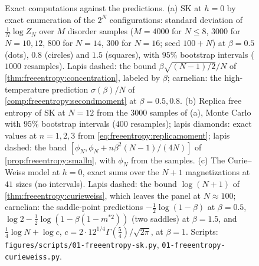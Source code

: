 \begin{refsection}
\begin{figure}[t]
\begin{fullwidth}
\end{fullwidth}
\caption{Exact computations against the predictions. (a) SK at $h=0$ by exact enumeration of the $2^N$ configurations: standard deviation of $\frac1N\log Z_N$ over $M$ disorder samples ($M=4000$ for $N\le8$, $3000$ for $N=10,12$, $800$ for $N=14$, $300$ for $N=16$; seed $100+N$) at $\beta=0.5$ (dots), $0.8$ (circles) and $1.5$ (squares), with $95\%$ bootstrap intervals ($1000$ resamples). Lapis dashed: the bound $\beta\sqrt{(N-1)/2}/N$ of \cref{thm:freeentropy:concentration}, labeled by $\beta$; carnelian: the high-temperature prediction $\sigma(\beta)/N$ of \cref{comp:freeentropy:secondmoment} at $\beta=0.5,0.8$. (b) Replica free entropy of SK at $N=12$ from the $3000$ samples of (a), Monte Carlo with $95\%$ bootstrap intervals ($400$ resamples); lapis diamonds: exact values at $n=1,2,3$ from \eqref{eq:freeentropy:replicamoment}; lapis dashed: the band $[\phi_N,\phi_N+n\beta^2(N-1)/(4N)]$ of \cref{prop:freeentropy:smalln}, with $\phi_N$ from the samples. (c) The Curie--Weiss model at $h=0$, exact sums over the $N+1$ magnetizations at $41$ sizes (no intervals). Lapis dashed: the bound $\log(N+1)$ of \cref{thm:freeentropy:curieweiss}, which leaves the panel at $N\approx100$; carnelian: the saddle-point predictions $-\frac12\log(1-\beta)$ at $\beta=0.5$, $\log2-\frac12\log(1-\beta(1-m^{*2}))$ (two saddles) at $\beta=1.5$, and $\frac14\log N+\log c$, $c=2\cdot12^{1/4}\Gamma(\frac54)/\sqrt{2\pi}$, at $\beta=1$. Scripts: \texttt{figures/scripts/01-freeentropy-sk.py}, \texttt{01-freeentropy-curieweiss.py}.}\label{fig:freeentropy:sk}
\end{figure}


\end{refsection}
